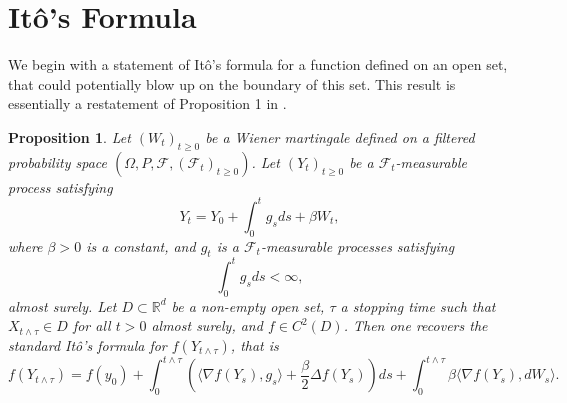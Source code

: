 \documentclass{article}
\newtheorem{prop}{Proposition}
\begin{document}
\appendix
\section{Itô's Formula}

We begin with a statement of Itô's formula for a function defined on an open set, that could potentially blow up on the boundary of this set. This result is essentially a restatement of Proposition 1 in \cite{JOHNSTON2026104772}.
\begin{prop}\label{prop: local Ito}
    Let $(W_t)_{t\geq 0}$ be a Wiener martingale defined on a filtered probability space $(\Omega, P, \mathcal{F}, (\mathcal{F}_t)_{t\geq 0})$. Let $(Y_t)_{t\geq 0}$ be a $\mathcal{F}_t$-measurable process satisfying
    \begin{equation}
        Y_t=Y_0+\int^t_0 g_s ds+\beta W_t,
    \end{equation}
    where $\beta>0$ is a constant, and $g_t$ is a $\mathcal{F}_t$-measurable processes satisfying  
    \begin{equation}
\int^t_0 g_s ds<\infty,
    \end{equation}
    almost surely. Let $D\subset \mathbb{R}^d$ be a non-empty open set, $\tau$ a stopping time such that $X_{t\wedge  \tau}\in D$ for all $t>0$ almost surely, and $f\in C^2(D)$. Then one recovers the standard Itô's formula for $f(Y_{t\wedge\tau})$, that is 
    \begin{equation}
        f(Y_{t\wedge\tau})= f(y_0)+\int^{t\wedge\tau}_0 (\langle \nabla f(Y_s), g_s\rangle +\frac{\beta}{2}\Delta f(Y_s))ds+\int^{t\wedge\tau}_0 \beta \langle \nabla f(Y_s), dW_s\rangle.
    \end{equation}
\end{prop}
\end{document}
